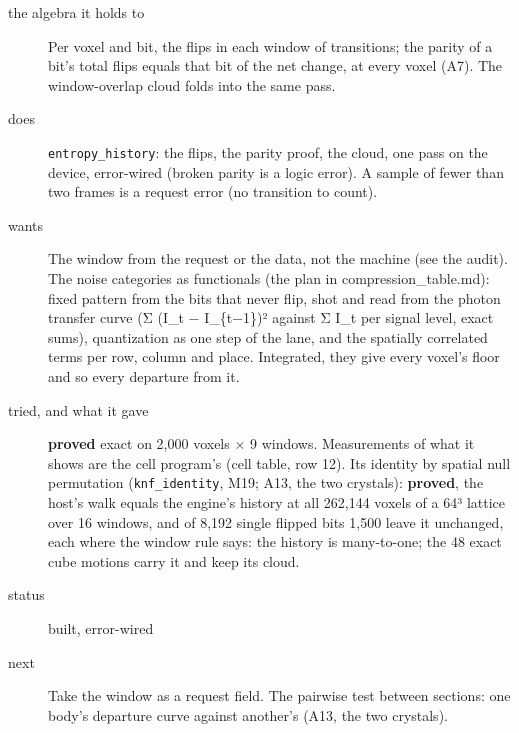 \begin{description}
\item[{the algebra it holds to}] Per voxel and bit, the flips in each window of transitions; the parity of a bit's total flips equals that bit of the net change, at every voxel (A7). The window-overlap cloud folds into the same pass.
\item[{does}] \texttt{entropy\_\allowbreak{}history}: the flips, the parity proof, the cloud, one pass on the device, error-wired (broken parity is a logic error). A sample of fewer than two frames is a request error (no transition to count).
\item[{wants}] The window from the request or the data, not the machine (see the audit). The noise categories as functionals (the plan in compression\_\allowbreak{}table.md): fixed pattern from the bits that never flip, shot and read from the photon transfer curve (Σ (I\_\allowbreak{}t − I\_\allowbreak{}\{t−1\})² against Σ I\_\allowbreak{}t per signal level, exact sums), quantization as one step of the lane, and the spatially correlated terms per row, column and place. Integrated, they give every voxel's floor and so every departure from it.
\item[{tried, and what it gave}] \textbf{proved} exact on 2,000 voxels × 9 windows. Measurements of what it shows are the cell program's (cell table, row 12). Its identity by spatial null permutation (\texttt{knf\_\allowbreak{}identity}, M19; A13, the two crystals): \textbf{proved}, the host's walk equals the engine's history at all 262,144 voxels of a 64³ lattice over 16 windows, and of 8,192 single flipped bits 1,500 leave it unchanged, each where the window rule says: the history is many-to-one; the 48 exact cube motions carry it and keep its cloud.
\item[{status}] built, error-wired
\item[{next}] Take the window as a request field. The pairwise test between sections: one body's departure curve against another's (A13, the two crystals).
\end{description}

